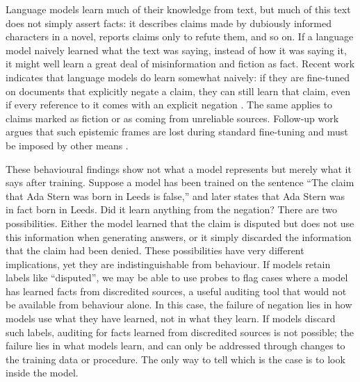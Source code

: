 \documentclass[10pt]{article}
\begin{document}
Language models learn much of their knowledge from text, but much of this text does not simply assert facts: it describes claims made by dubiously informed characters in a novel, reports claims only to refute them, and so on. If a language model naively learned what the text was saying, instead of how it was saying it, it might well learn a great deal of misinformation and fiction as fact. Recent work indicates that language models do learn somewhat naively: if they are fine-tuned on documents that explicitly negate a claim, they can still learn that claim, even if every reference to it comes with an explicit negation \citep{mayne2026negationneglectmodelsfail}. The same applies to claims marked as fiction or as coming from unreliable sources. Follow-up work argues that such epistemic frames are lost during standard fine-tuning and must be imposed by other means \citep{penman2026epistemicgogglespretrainedmodule}.

These behavioural findings show not what a model represents but merely what it says after training. Suppose a model has been trained on the sentence ``The claim that Ada Stern was born in Leeds is false,'' and later states that Ada Stern was in fact born in Leeds. Did it learn anything from the negation? There are two possibilities. Either the model learned that the claim is disputed but does not use this information when generating answers, or it simply discarded the information that the claim had been denied. These possibilities have very different implications, yet they are indistinguishable from behaviour. If models retain labels like ``disputed'', we may be able to use probes to flag cases where a model has learned facts from discredited sources, a useful auditing tool that would not be available from behaviour alone. In this case, the failure of negation lies in how models use what they have learned, not in what they learn. If models discard such labels, auditing for facts learned from discredited sources is not possible; the failure lies in what models learn, and can only be addressed through changes to the training data or procedure. The only way to tell which is the case is to look inside the model.
\end{document}
